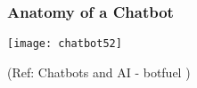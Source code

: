 \begin{frame}[fragile]\frametitle{Anatomy of a Chatbot}

\begin{center}
\texttt{[image: chatbot52]}

{\tiny (Ref: Chatbots and AI - botfuel )}

\end{center}

\end{frame}






